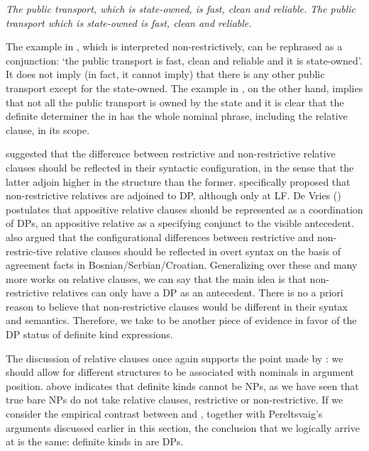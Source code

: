 \documentclass[output=paper
,modfonts
,nonflat]{langsci/langscibook}
\begin{document}
	\ea\label{ex:borik:25}
	\ea\label{ex:borik:25a} 
	\textit{
		{\ob}{\ob}The public transport{\cb}, {\ob}which is state-owned{\cb}{\cb}, is fast, clean and reliable.
	}
	\ex\label{ex:borik:25b}
	\textit{
		{\ob}The {\ob}public transport which is state-owned{\cb}{\cb} is fast, clean and reliable.
	}
	\z
	\z
	
	The example in , which is interpreted non-restrictively, can be rephrased as a conjunction: `the public transport is fast, clean and reliable and it is state-owned'. It does not imply (in fact, it cannot imply) that there is any other public transport except for the state-owned. The example in , on the other hand, implies that not all the public transport is owned by the state and it is clear that the definite determiner the in  has the whole nominal phrase, including the relative clause, in its scope. 
	
	\citet{Jackendoff1977} suggested that the difference between restrictive and non-restrictive relative clauses should be reflected in their syntactic configuration, in the sense that the latter adjoin higher in the structure than the former. \citet{Demirdache1991} specifically proposed that non-restrictive relatives are adjoined to DP, although only at LF. De Vries (\citeyear{deVries2006}) postulates that appositive relative clauses should be represented as a coordination of DPs, an appositive relative as a specifying conjunct to the visible antecedent. \citet{Arsenijevic2016} also argued that the configurational differences between restrictive and non-restric\hyp{}tive relative clauses should be reflected in overt syntax on the basis of agreement facts in Bosnian/Serbian/Croatian. Generalizing over these and many more works on relative clauses, we can say that the main idea is that non-restrictive relatives can only have a DP as an antecedent. There is no a priori reason to believe that  non-restrictive clauses would be different in their syntax and semantics. Therefore, we take  to be another piece of evidence in favor of the DP status of definite kind expressions. 
	
	The discussion of relative clauses once again supports the point made by \citet{Pereltsvaig2006}: we should allow for different structures to be associated with nominals in argument position.  above indicates that definite kinds cannot be NPs, as we have seen that true bare NPs do not take relative clauses, restrictive or non-restrictive. If we consider the empirical contrast between  and , together with Pereltsvaig's arguments discussed earlier in this section, the conclusion that we logically arrive at is the same: definite kinds in  are DPs.
	
\end{document}
